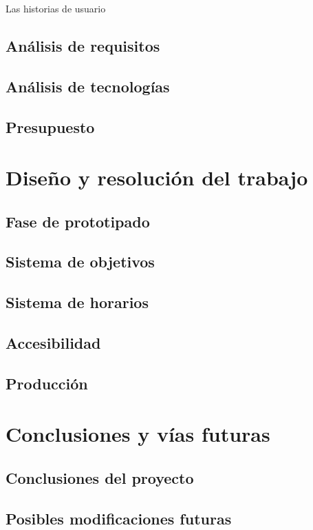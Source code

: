 \documentclass[10pt, a4paper]{aqademic}
\begin{document}
Las historias de usuario


\section{Análisis de requisitos}

\section{Análisis de tecnologías}

\section{Presupuesto}


\chapter{Diseño y resolución del trabajo}

\section{Fase de prototipado}

\section{Sistema de objetivos}

\section{Sistema de horarios}

\section{Accesibilidad}

\section{Producción}


\chapter{Conclusiones y vías futuras}

\section{Conclusiones del proyecto}

\section{Posibles modificaciones futuras}

\newpage



\end{document}
